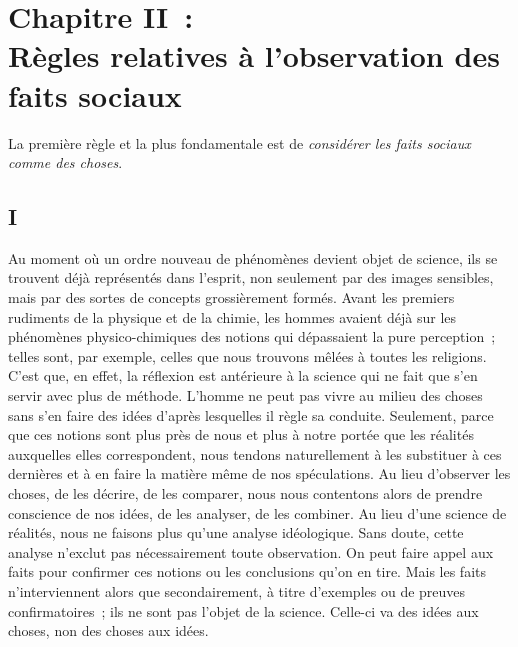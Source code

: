 \documentclass[french,twoside]{book} %
\newcommand\chapteropen{} %
\newcommand\chaptercont{} %
\begin{document}
\chapteropen
\chapter[{Chapitre II : Règles relatives à l’observation des faits sociaux}]{Chapitre II : \\
Règles relatives à l’observation des faits sociaux}\renewcommand{\leftmark}{Chapitre II : \\
Règles relatives à l’observation des faits sociaux}


\chaptercont
\noindent La première règle et la plus fondamentale est de {\itshape considérer les faits sociaux comme des choses}.\par
\section[{I}]{I}
\noindent Au moment où un ordre nouveau de phénomènes devient objet de science, ils se trouvent déjà représentés dans l’esprit, non seulement par des images sensibles, mais par des sortes de concepts grossièrement formés. Avant les premiers rudiments de la physique et de la chimie, les hommes avaient déjà sur les phénomènes physico-chimiques des notions qui dépassaient la pure perception ; telles sont, par exemple, celles que nous trouvons mêlées à toutes les religions. C’est que, en effet, la réflexion est antérieure à la science qui ne fait que s’en servir avec plus de méthode. L’homme ne peut pas vivre au milieu des choses sans s’en faire des idées d’après lesquelles il règle sa conduite. Seulement, parce que ces notions sont plus près de nous et plus à notre portée que les réalités auxquelles elles correspondent, nous tendons naturellement à les substituer à ces dernières et à en faire la matière même de nos spéculations. Au lieu d’observer les choses, de les décrire, de les comparer, nous nous contentons alors de prendre conscience de nos idées, de les analyser, de les combiner. Au lieu d’une science de réalités, nous ne faisons plus qu’une analyse idéologique. Sans doute, cette analyse n’exclut pas nécessairement toute observation. On peut faire appel aux faits pour confirmer ces notions ou les conclusions qu’on en tire. Mais les faits n’interviennent alors que secondairement, à titre d’exemples ou de preuves confirmatoires ; ils ne sont pas l’objet de la science. Celle-ci va des idées aux choses, non des choses aux idées.\par
\end{document}
